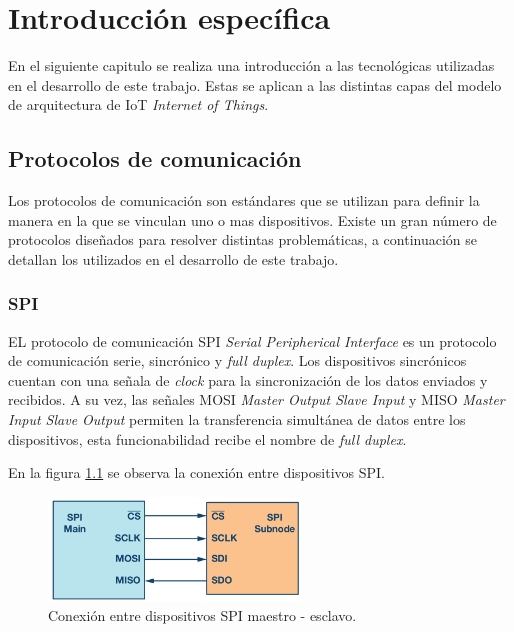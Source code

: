 \chapter{Introducción específica} %

\label{Chapter2}

En el siguiente capitulo se realiza una introducción a las tecnológicas utilizadas en el desarrollo de este trabajo. Estas se aplican a las distintas capas del modelo de arquitectura de IoT \textit{Internet of Things}.
\section{Protocolos de comunicación}
\label{sec:ejemplo}

Los protocolos de comunicación son estándares que se utilizan para definir la manera en la que se vinculan uno o mas dispositivos. Existe un gran número de protocolos diseñados para resolver distintas problemáticas, a continuación se detallan los utilizados en el desarrollo de este trabajo.

\subsection{SPI}

EL protocolo de comunicación SPI \textit{Serial Peripherical Interface} es un protocolo de comunicación serie, sincrónico y \textit{full duplex}. Los dispositivos sincrónicos cuentan con una señala de \textit{clock} para la sincronización de los datos enviados y recibidos. A su vez, las señales MOSI \textit{Master Output Slave Input} y MISO \textit{Master Input Slave Output} permiten la transferencia simultánea de datos entre los dispositivos, esta funcionabilidad recibe el nombre de \textit{full duplex}\citep{ARTICLE3}.

En la figura \ref{fig:SPI} se observa la conexión entre dispositivos SPI.

\begin{figure}[htbp]
	\centering
	\includegraphics[width=0.6\textwidth]{./Figures/SPI.png}
	\caption{Conexión entre dispositivos SPI maestro - esclavo.}
	\label{fig:SPI}
\end{figure} 

